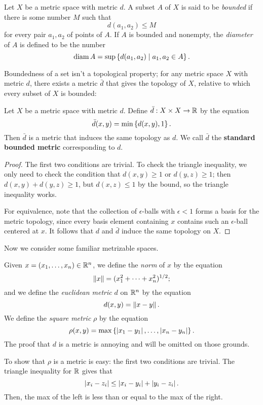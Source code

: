 \documentclass[10pt]{report}
\begin{document}
\begin{definition}
  Let $X$ be a metric space with metric $d$.
  A subset $A$ of $X$ is said to be \emph{bounded} if there is some number $M$ such that
  \[ d(a_1,a_2) \leq M \]
  for every pair $a_1,a_2$ of points of $A$.
  If $A$ is bounded and nonempty, the \emph{diameter} of $A$ is defined to be the number
  \[ \text{diam} \, A = \sup \left\{ d(a_1,a_2) \mid a_1,a_2 \in A \right\}. \]
\end{definition}

Boundedness of a set isn't a topological property; for any metric space $X$ with metric $d$, there exists a metric $\bar d$ that gives the topology of $X$, relative to which every subset of $X$ is bounded:

\begin{theorem}
  Let $X$ be a metric space with metric $d$.
  Define $\bar d: X \times X \rightarrow \mathbb{R}$ by the equation
  \[ \bar d(x,y) = \min \left\{ d(x,y),1 \right\}. \]
  Then $\bar{d}$ is a metric that induces the same topology as $d$.
  We call $\bar{d}$ the \textbf{standard bounded metric} corresponding to $d$.
\end{theorem}
\begin{proof}
  The first two conditions are trivial.
  To check the triangle inequality, we only need to check the condition that $d(x,y) \geq 1$ or $d(y,z) \geq 1$;
  then $d(x,y) + d(y,z) \geq 1$, but $d(x,z) \leq 1$ by the bound, so the triangle inequality works.

  For equivalence, note that the collection of $\epsilon$-balls with $\epsilon < 1$ forms a basis for the metric topology, since every basis element containing $x$ contains such an $\epsilon$-ball centered at $x$.
  It follows that $d$ and $\bar d$ induce the same topology on $X$.
\end{proof}

Now we consider some familiar metrizable spaces.
\begin{definition}
  Given $x = (x_1,\dots,x_n) \in \mathbb{R}^n$, we define the \emph{norm} of $x$ by the equation
  \[ \left\| x \right\| = (x_1^2 + \dots + x_n^2)^{1/2}; \]
  and we define the \emph{euclidean metric} $d$ on $\mathbb{R}^n$ by the equation
  \[ d(x,y) = \left\| x - y \right\|. \]
  We define the \emph{square metric} $\rho$ by the equation
  \[ \rho(x,y) = \max \left\{ \left| x_1 - y_1 \right|,\dots,\left| x_n - y_n \right| \right\}. \]
  The proof that $d$ is a metric is annoying and will be omitted on those grounds.
\end{definition}

To show that $\rho$ is a metric is easy: the first two conditions are trivial.
The triangle inequality for $\mathbb{R}$ gives that
\[ \left| x_i - z_i \right| \leq \left| x_i - y_i \right| + \left| y_i - z_i \right|.\]
Then, the max of the left is less than or equal to the max of the right.
\end{document}

